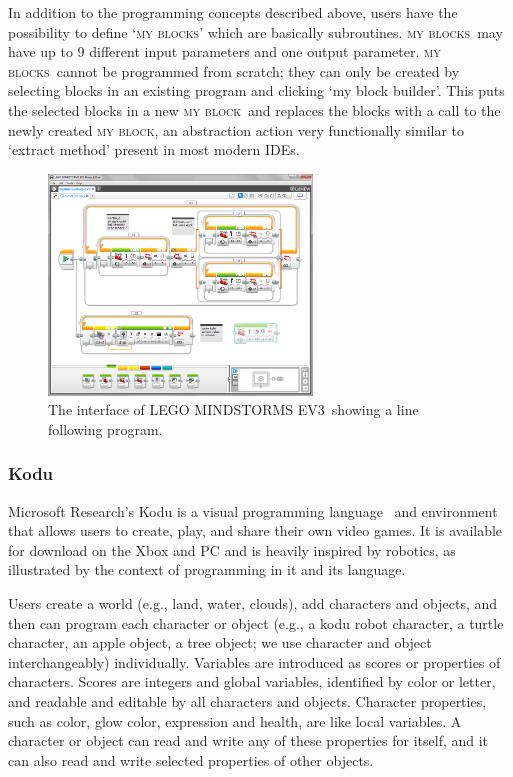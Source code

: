 \documentclass[conference]{IEEEtran}
\newcommand{\ms}{LEGO MINDSTORMS EV3}
\newcommand{\mbs}{\textsc{my blocks}}
\newcommand{\mb}{\textsc{my block}}
\begin{document}
In addition to the programming concepts described above, users have the possibility to define `\mbs' which are basically  subroutines. \mbs~may have up to 9 different input parameters and one output parameter. \mbs~cannot be programmed from scratch; they can only be created by selecting blocks in an existing program and clicking `my block builder'. This puts the selected blocks in a new \mb~and replaces the blocks with a call to the newly created \mb, an abstraction action very functionally similar to `extract method' present in most modern IDEs. 

\begin{figure} [tb]
\centering
\includegraphics[width=7cm]{img/ms}
\caption{The interface of \ms~showing a line following program.}
\label{fig:ms}
\vspace{-6pt}
\end{figure}


\subsubsection{Kodu}
Microsoft Research's Kodu is a visual programming language~\cite{kodugrammar} and environment that allows users to create, play, and share their own video games. 
It is available for download on the Xbox and PC and is heavily inspired by robotics, as illustrated by the context of programming in it and its language. 


Users create a world (e.g., land, water, clouds),  add characters and objects, and then can program each character or object (e.g., a kodu robot character, a turtle character, an apple object, a tree object; we use character and object interchangeably) individually. Variables are introduced as scores or properties of characters. Scores are integers and global variables, identified by color or letter, and readable and editable by all characters and objects. Character properties, such as color, glow color, expression and health, are like local variables. A character or object can read and write any of these properties for itself, and it can also read and write selected properties of other objects. 
\end{document}
